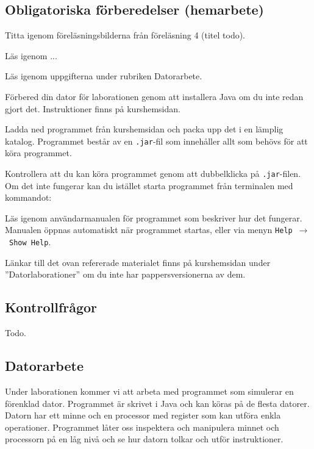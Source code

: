 \subsection*{Obligatoriska förberedelser (hemarbete)}
\begin{Hemarbete}\firmlist
    \item Titta igenom föreläsningsbilderna från föreläsning 4 (titel todo).
    \item Läs igenom ...
    \item Läs igenom uppgifterna under rubriken Datorarbete.
    \item Förbered din dator för laborationen genom att installera Java om du inte redan gjort det. Instruktioner finns på kurshemsidan.
    \item Ladda ned programmet \textbf{\progname{}} från kurshemsidan och packa upp det i en lämplig katalog. Programmet består av en \texttt{.jar}-fil som innehåller allt som behövs för att köra programmet.
    \item Kontrollera att du kan köra programmet genom att dubbelklicka på \texttt{.jar}-filen. Om det inte fungerar kan du istället starta programmet från terminalen med kommandot:
    \begin{center}
        {}
    \end{center}
    \item Läs igenom användarmanualen för programmet som beskriver hur det fungerar. Manualen öppnas automatiskt när programmet startas, eller via menyn \texttt{Help}~$\rightarrow$~\texttt{Show Help}.
\end{Hemarbete}
Länkar till det ovan refererade materialet finns på kurshemsidan under  ''Datorlaborationer'' om du inte har pappersversionerna av dem.

\subsection*{Kontrollfrågor}
\begin{Kontrollfragor}
    \item Todo.
\end{Kontrollfragor}

% 

\clearpage
\subsection*{Datorarbete}
Under laborationen kommer vi att arbeta med programmet \progname{} som simulerar en förenklad dator. Programmet är skrivet i Java och kan köras på de flesta datorer. Datorn har ett minne och en processor med register som kan utföra enkla operationer. Programmet låter oss inspektera och manipulera minnet och processorn på en låg nivå och se hur datorn tolkar och utför instruktioner.



